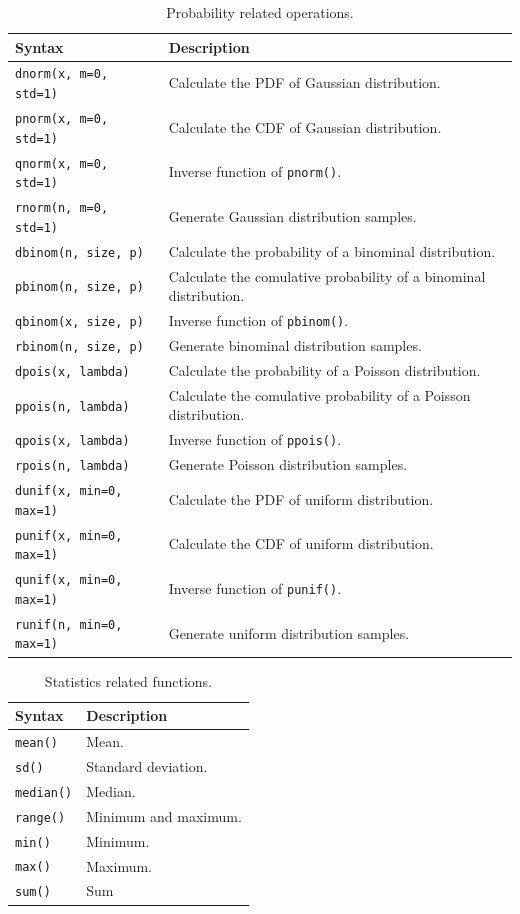 \begin{table}[!htb]
	\centering \caption{Probability related operations.}\label{ch:r1:tab:probabilityfunction}
	\begin{tabularx}{\textwidth}{lX}
		\hline
		Syntax & Description \\ \hline
		\verb|dnorm(x, m=0, std=1)| & Calculate the PDF of Gaussian distribution. \\
		\verb|pnorm(x, m=0, std=1)| & Calculate the CDF of Gaussian distribution. \\
		\verb|qnorm(x, m=0, std=1)| & Inverse function of \verb|pnorm()|. \\
		\verb|rnorm(n, m=0, std=1)| & Generate Gaussian distribution samples. \\
		\verb|dbinom(n, size, p)| & Calculate the probability of a binominal distribution. \\
		\verb|pbinom(n, size, p)| & Calculate the comulative probability of a binominal distribution. \\
		\verb|qbinom(x, size, p)| & Inverse function of \verb|pbinom()|. \\
		\verb|rbinom(n, size, p)| & Generate binominal distribution samples. \\
		\verb|dpois(x, lambda)| & Calculate the probability of a Poisson distribution. \\
		\verb|ppois(n, lambda)| & Calculate the comulative probability of a Poisson distribution. \\
		\verb|qpois(x, lambda)| & Inverse function of \verb|ppois()|. \\
		\verb|rpois(n, lambda)| & Generate Poisson distribution samples. \\
		\verb|dunif(x, min=0, max=1)| & Calculate the PDF of uniform distribution. \\
		\verb|punif(x, min=0, max=1)| & Calculate the CDF of uniform distribution. \\
		\verb|qunif(x, min=0, max=1)| & Inverse function of \verb|punif()|. \\
		\verb|runif(n, min=0, max=1)| & Generate uniform distribution samples. \\
		\hline
	\end{tabularx}
\end{table}

\begin{table}[!htb]
	\centering \caption{Statistics related functions.}\label{ch:r1:tab:statisticsfunction}
	\begin{tabularx}{\textwidth}{lX}
		\hline
		Syntax & Description \\ \hline
		\verb|mean()| & Mean. \\
		\verb|sd()| & Standard deviation. \\
		\verb|median()| & Median. \\
		\verb|range()| & Minimum and maximum. \\
		\verb|min()| & Minimum. \\
		\verb|max()| & Maximum. \\
		\verb|sum()| & Sum \\
		\hline
	\end{tabularx}
\end{table}

